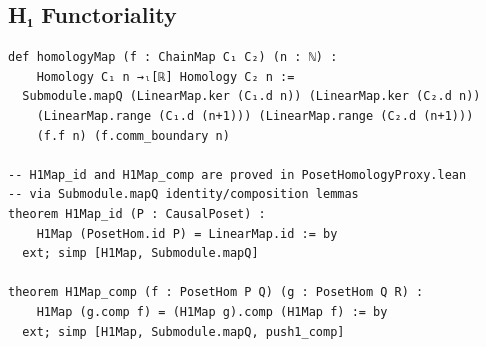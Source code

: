 \documentclass[12pt]{article}
\begin{document}
\subsection{H₁ Functoriality}

\begin{verbatim}
def homologyMap (f : ChainMap C₁ C₂) (n : ℕ) :
    Homology C₁ n →ₗ[ℝ] Homology C₂ n :=
  Submodule.mapQ (LinearMap.ker (C₁.d n)) (LinearMap.ker (C₂.d n))
    (LinearMap.range (C₁.d (n+1))) (LinearMap.range (C₂.d (n+1)))
    (f.f n) (f.comm_boundary n)

-- H1Map_id and H1Map_comp are proved in PosetHomologyProxy.lean
-- via Submodule.mapQ identity/composition lemmas
theorem H1Map_id (P : CausalPoset) :
    H1Map (PosetHom.id P) = LinearMap.id := by
  ext; simp [H1Map, Submodule.mapQ]

theorem H1Map_comp (f : PosetHom P Q) (g : PosetHom Q R) :
    H1Map (g.comp f) = (H1Map g).comp (H1Map f) := by
  ext; simp [H1Map, Submodule.mapQ, push1_comp]
\end{verbatim}
\end{document}
